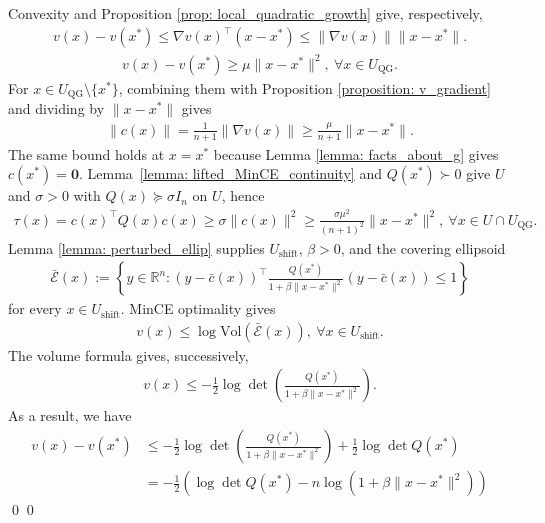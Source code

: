 \documentclass[smallextended]{svjour3}
\let\springerproof\proof
\let\endspringerproof\endproof
\renewenvironment{proof}{\springerproof}{%
  \ifhmode\qed\else\leavevmode\qed\fi\endspringerproof}
\newcommand{\V}{{\mathrm{Vol}}}
\newcommand{\R}{\mathbb{R}}
\newcommand{\E}{\mathcal{E}}
\begin{document}
\begin{proof}
    Convexity and Proposition \ref{prop: local_quadratic_growth} give, respectively,
    \begin{align*}
        v(x) -v(x^*) \leq \nabla v(x)^\top (x-x^*) \leq \|\nabla v(x)\|\|x-x^*\|.
    \end{align*}
    \begin{align*}
        v(x) - v(x^*) \geq \mu \|x-x^*\|^2,~\forall x\in U_{\mathrm{QG}}.
    \end{align*}
    For $x\in U_{\mathrm{QG}}\setminus\{x^*\}$, combining them with Proposition
    \ref{proposition: v_gradient} and dividing by $\|x-x^*\|$ gives
    \begin{align*}
        \|c(x)\| = \frac{1}{n+1}\|\nabla v(x)\|\geq \frac{\mu}{n+1} \|x-x^*\|.
    \end{align*}
    The same bound holds at $x=x^*$ because Lemma
    \ref{lemma: facts_about_g} gives $c(x^*)=\mathbf0$.
    Lemma~\ref{lemma: lifted_MinCE_continuity} and $Q(x^*)\succ0$ give $U$
    and $\sigma>0$ with
    $Q(x)\succeq\sigma I_n$ on $U$, hence
    \begin{align}
        \tau(x) = c(x)^\top Q(x)c(x) \geq \sigma \|c(x)\|^2 \geq \frac{\sigma \mu^2}{(n+1)^2}\|x-x^*\|^2, ~\forall x\in U\cap U_{\mathrm{QG}}.  \label{eq: quadratic_lb_tau}
    \end{align}
    Lemma \ref{lemma: perturbed_ellip} supplies $U_{\mathrm{shift}}$, $\beta>0$,
    and the covering ellipsoid
    \begin{align*}
        \bar{\E}(x)
        :=
        \left\{
        y\in\R^n:
        (y-\bar c(x))^\top \frac{Q(x^*)}{1+\beta\|x-x^*\|^2}(y-\bar c(x))\leq 1
        \right\}
    \end{align*}
    for every $x\in U_{\mathrm{shift}}$. MinCE optimality gives
    \begin{align*}
        v(x)\leq \log \V(\bar{\E}(x)), ~ \forall x\in U_{\mathrm{shift}}.
    \end{align*}
    The volume formula gives, successively,
    \begin{align*}
        v(x)
        \leq
        -\frac12\log\det\left(\frac{Q(x^*)}{1+\beta\|x-x^*\|^2}\right).
    \end{align*}
    As a result, we have 
    \begin{align*}
        v(x)-v(x^*)
        &\leq
        -\frac12\log\det\left(\frac{Q(x^*)}{1+\beta\|x-x^*\|^2}\right)
        +\frac12\log\det Q(x^*) \\
        &=
        -\frac12\left(\log\det Q(x^*)-n\log(1+\beta\|x-x^*\|^2)\right)

\end{align*}
\end{proof}
\end{document}
